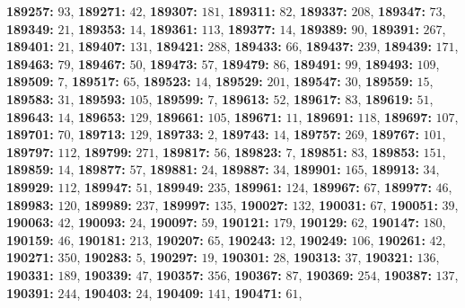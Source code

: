 \textsf{\bfseries 189257:} $93$, \textsf{\bfseries 189271:} $42$, \textsf{\bfseries 189307:} $181$, \textsf{\bfseries 189311:} $82$, \textsf{\bfseries 189337:} $208$, \textsf{\bfseries 189347:} $73$, \textsf{\bfseries 189349:} $21$, \textsf{\bfseries 189353:} $14$, \textsf{\bfseries 189361:} $113$, \textsf{\bfseries 189377:} $14$, \textsf{\bfseries 189389:} $90$, \textsf{\bfseries 189391:} $267$, \textsf{\bfseries 189401:} $21$, \textsf{\bfseries 189407:} $131$, \textsf{\bfseries 189421:} $288$, \textsf{\bfseries 189433:} $66$, \textsf{\bfseries 189437:} $239$, \textsf{\bfseries 189439:} $171$, \textsf{\bfseries 189463:} $79$, \textsf{\bfseries 189467:} $50$, \textsf{\bfseries 189473:} $57$, \textsf{\bfseries 189479:} $86$, \textsf{\bfseries 189491:} $99$, \textsf{\bfseries 189493:} $109$, \textsf{\bfseries 189509:} $7$, \textsf{\bfseries 189517:} $65$, \textsf{\bfseries 189523:} $14$, \textsf{\bfseries 189529:} $201$, \textsf{\bfseries 189547:} $30$, \textsf{\bfseries 189559:} $15$, \textsf{\bfseries 189583:} $31$, \textsf{\bfseries 189593:} $105$, \textsf{\bfseries 189599:} $7$, \textsf{\bfseries 189613:} $52$, \textsf{\bfseries 189617:} $83$, \textsf{\bfseries 189619:} $51$, \textsf{\bfseries 189643:} $14$, \textsf{\bfseries 189653:} $129$, \textsf{\bfseries 189661:} $105$, \textsf{\bfseries 189671:} $11$, \textsf{\bfseries 189691:} $118$, \textsf{\bfseries 189697:} $107$, \textsf{\bfseries 189701:} $70$, \textsf{\bfseries 189713:} $129$, \textsf{\bfseries 189733:} $2$, \textsf{\bfseries 189743:} $14$, \textsf{\bfseries 189757:} $269$, \textsf{\bfseries 189767:} $101$, \textsf{\bfseries 189797:} $112$, \textsf{\bfseries 189799:} $271$, \textsf{\bfseries 189817:} $56$, \textsf{\bfseries 189823:} $7$, \textsf{\bfseries 189851:} $83$, \textsf{\bfseries 189853:} $151$, \textsf{\bfseries 189859:} $14$, \textsf{\bfseries 189877:} $57$, \textsf{\bfseries 189881:} $24$, \textsf{\bfseries 189887:} $34$, \textsf{\bfseries 189901:} $165$, \textsf{\bfseries 189913:} $34$, \textsf{\bfseries 189929:} $112$, \textsf{\bfseries 189947:} $51$, \textsf{\bfseries 189949:} $235$, \textsf{\bfseries 189961:} $124$, \textsf{\bfseries 189967:} $67$, \textsf{\bfseries 189977:} $46$, \textsf{\bfseries 189983:} $120$, \textsf{\bfseries 189989:} $237$, \textsf{\bfseries 189997:} $135$, \textsf{\bfseries 190027:} $132$, \textsf{\bfseries 190031:} $67$, \textsf{\bfseries 190051:} $39$, \textsf{\bfseries 190063:} $42$, \textsf{\bfseries 190093:} $24$, \textsf{\bfseries 190097:} $59$, \textsf{\bfseries 190121:} $179$, \textsf{\bfseries 190129:} $62$, \textsf{\bfseries 190147:} $180$, \textsf{\bfseries 190159:} $46$, \textsf{\bfseries 190181:} $213$, \textsf{\bfseries 190207:} $65$, \textsf{\bfseries 190243:} $12$, \textsf{\bfseries 190249:} $106$, \textsf{\bfseries 190261:} $42$, \textsf{\bfseries 190271:} $350$, \textsf{\bfseries 190283:} $5$, \textsf{\bfseries 190297:} $19$, \textsf{\bfseries 190301:} $28$, \textsf{\bfseries 190313:} $37$, \textsf{\bfseries 190321:} $136$, \textsf{\bfseries 190331:} $189$, \textsf{\bfseries 190339:} $47$, \textsf{\bfseries 190357:} $356$, \textsf{\bfseries 190367:} $87$, \textsf{\bfseries 190369:} $254$, \textsf{\bfseries 190387:} $137$, \textsf{\bfseries 190391:} $244$, \textsf{\bfseries 190403:} $24$, \textsf{\bfseries 190409:} $141$, \textsf{\bfseries 190471:} $61$, 
